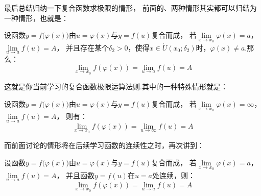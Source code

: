 \newpage
最后总结归纳一下复合函数求极限的情形，
前面的、两种情形其实都可以归结为一种情形，也就是：
\begin{framed}
    设函数$y=f\bigl(\varphi(x)\bigr)$由$u=\varphi(x)$与$y=f(u)$复合而成，
    若$\lim\limits_{x \to x_0}\varphi(x)=a$，$\lim\limits_{u \to a}f(u)=A$，
    并且存在某个$\delta_2>0$，使得$x\in\mathring{U}(x_0;\delta_2)$时，$\varphi(x)\neq a$.那么：
    \begin{equation*}
        \lim_{x \to x_0} f(\varphi(x))=\lim_{u \to a} f(u)=A
    \end{equation*}
\end{framed}
这就是你当前学习的复合函数极限运算法则.其中的一种特殊情形就是：
\begin{framed}
    设函数$y=f\bigl(\varphi(x)\bigr)$由$u=\varphi(x)$与$y=f(u)$复合而成，
    若$\lim\limits_{x \to x_0}\varphi(x)=\infty$，$\lim\limits_{u \to a}f(u)=A$，
    则有：
    \begin{equation*}
        \lim_{x \to x_0} f(\varphi(x))=\lim_{u \to \infty} f(u)=A
    \end{equation*}
\end{framed}

而前面讨论的情形将在后续学习函数的连续性之时，再次讲到：
\begin{framed}
    设函数$y=f\bigl(\varphi(x)\bigr)$由$u=\varphi(x)$与$y=f(u)$复合而成，
    若$\lim\limits_{x \to x_0}\varphi(x)=a$，$\lim\limits_{u \to a}f(u)=A$，
    并且函数$y=f(u)$在$u=a$处连续，则：
    \begin{equation*}
        \lim_{x \to x_0} f(\varphi(x))=\lim_{u \to a} f(u)=A
    \end{equation*}
\end{framed}



